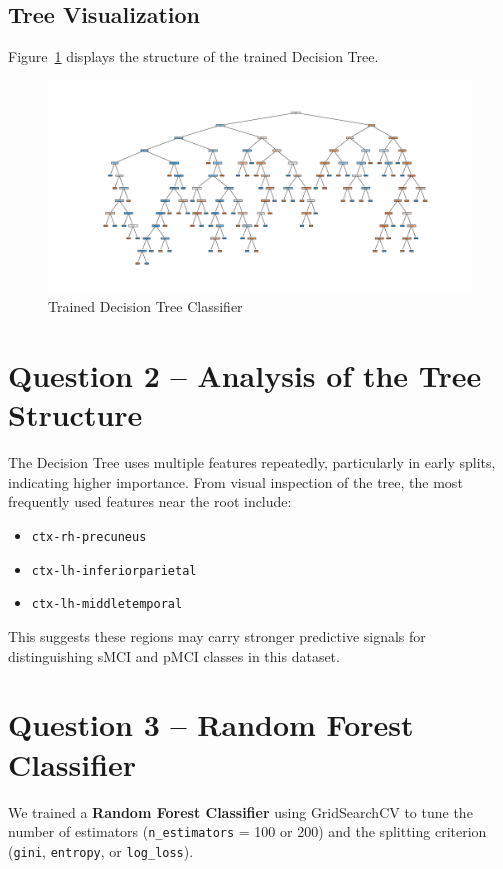 \documentclass[12pt]{article}
\begin{document}
\subsection*{Tree Visualization}
Figure~\ref{fig:tree} displays the structure of the trained Decision Tree.

\begin{figure}[H]
    \centering
    \includegraphics[width=\textwidth]{IMG/Figure_1.png}
    \caption{Trained Decision Tree Classifier}
    \label{fig:tree}
\end{figure}

\section*{Question 2 – Analysis of the Tree Structure}

The Decision Tree uses multiple features repeatedly, particularly in early splits, indicating higher importance. From visual inspection of the tree, the most frequently used features near the root include:

\begin{itemize}
    \item \texttt{ctx-rh-precuneus}
    \item \texttt{ctx-lh-inferiorparietal}
    \item \texttt{ctx-lh-middletemporal}
\end{itemize}

This suggests these regions may carry stronger predictive signals for distinguishing sMCI and pMCI classes in this dataset.

\section*{Question 3 – Random Forest Classifier}

We trained a \textbf{Random Forest Classifier} using GridSearchCV to tune the number of estimators (\texttt{n\_estimators} = 100 or 200) and the splitting criterion (\texttt{gini}, \texttt{entropy}, or \texttt{log\_loss}).
\end{document}
